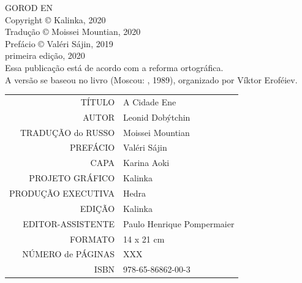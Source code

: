 \newpage
\pagestyle{empty}
\MyriadPro
\scriptsize
\begin{center}
GOROD EN\\[6pt]

Copyright © Kalinka, 2020\\[6pt]

Tradução © Moissei Mountian, 2020\\[6pt]

Prefácio © Valéri Sájin, 2019\\[6pt]

primeira edição, 2020\\[40pt]


Essa publicação está de acordo com a reforma ortográfica.\\[6pt]
A versão se baseou no livro {} (Moscou: {}, 1989), organizado por Víktor Eroféiev.\\[6pt]	
\end{center}


\bigskip

\begin{vplace}[1]
\begin{table}[ht!]
\centering
\MyriadPro\itshape
\scriptsize
\begin{tabular}{rl}
TÍTULO            & A Cidade Ene 									   \\[2pt]
AUTOR             & Leonid Dobýtchin                          		   \\[2pt]
TRADUÇÃO do RUSSO & Moissei Mountian 				                   \\[2pt]
PREFÁCIO          & Valéri Sájin	                                   \\[2pt]
CAPA              & Karina Aoki		                                   \\[2pt]
PROJETO GRÁFICO   & Kalinka                                            \\[2pt]
PRODUÇÃO EXECUTIVA & Hedra                                             \\[2pt]
EDIÇÃO            & Kalinka 		                                   \\[2pt] 
EDITOR-ASSISTENTE & Paulo Henrique Pompermaier                         \\[2pt] 
FORMATO           & 14 x 21 cm                                         \\[2pt]
NÚMERO de PÁGINAS & XXX                                                \\[2pt]
ISBN              & 978-65-86862-00-3                                 
\end{tabular}
\end{table}
\end{vplace}

